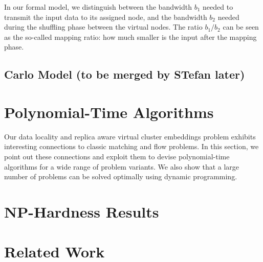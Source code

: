\documentclass[9pt,twocolumn]{scrartcl}
\begin{document}
In our formal model, we distinguish between the bandwidth $b_1$ needed to
transmit the input data to its assigned node, and the bandwidth $b_2$
needed during the shuffling phase between the virtual nodes.
The ratio $b_1/b_2$ can be seen as the so-called mapping ratio:
how much smaller is the input after the mapping phase.



\subsection{Carlo Model (to be merged by STefan later)}


\section{Polynomial-Time Algorithms}\label{sec:poly}

Our data locality and replica aware virtual cluster embeddings
problem exhibits interesting connections to classic matching and
flow problems. In this section, we point out these connections and
exploit them to devise polynomial-time algorithms for a wide range
of problem variants. We also show that a large number of problems
can be solved optimally using dynamic programming.









\section{NP-Hardness Results}\label{sec:np}




\section{Related Work}\label{sec:relwork}
\end{document}
